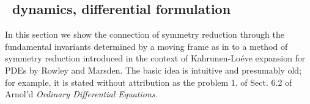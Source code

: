 

\renewcommand{\Group}{\ensuremath{G}}         %

\subsection{\Slice\ dynamics, differential formulation}
\label{sec:MovFrameODE}



In this section we show the connection of symmetry reduction through the
fundamental invariants determined  by a moving frame as in 
to a method of symmetry reduction introduced in the context of Kahrunen-Lo\'eve
expansion for PDEs by Rowley and Marsden.
The basic idea is intuitive and presumably old; for example, it is stated
without attribution as the problem 1. of Sect. 6.2 of Arnol'd
{\em Ordinary Differential Equations}.


